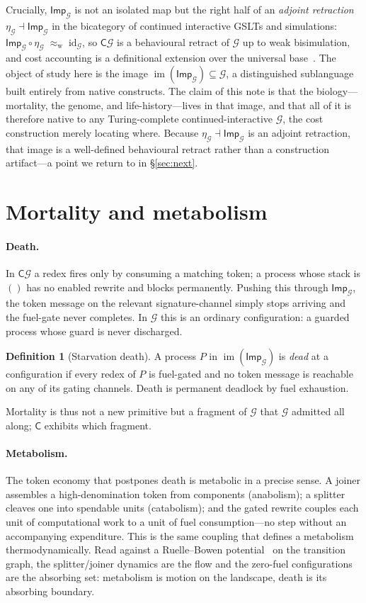 \documentclass[11pt]{article}
\theoremstyle{plain}
\theoremstyle{definition}
\newtheorem{definition}{Definition}
\theoremstyle{remark}
\newcommand{\G}{\mathcal{G}}
\newcommand{\C}{\mathsf{C}}
\newcommand{\Imp}{\mathsf{Imp}}
\newcommand{\unit}{\eta}
\newcommand{\wbisim}{\;\approx_{\mathrm{w}}\;}
\newcommand{\id}{\mathrm{id}}
\begin{document}
Crucially, $\Imp_\G$ is not an isolated map but the right half of an
\emph{adjoint retraction} $\unit_\G\dashv\Imp_\G$ in the bicategory of continued
interactive GSLTs and simulations: $\Imp_\G\circ\unit_\G\wbisim\id_\G$, so $\C\G$
is a behavioural retract of $\G$ up to weak bisimulation, and cost accounting is
a definitional extension over the universal base~\cite{noteII}. The object of
study here is the image $\operatorname{im}(\Imp_\G)\subseteq\G$, a distinguished
sublanguage built entirely from native constructs. The claim of this note is
that the biology---mortality, the genome, and life-history---lives in that
image, and that all of it is therefore native to any Turing-complete
continued-interactive $\G$, the cost construction merely locating where. Because
$\unit_\G\dashv\Imp_\G$ is an adjoint retraction, that image is a well-defined
behavioural retract rather than a construction artifact---a point we return to
in \S\ref{sec:next}.

\section{Mortality and metabolism}
\label{sec:mortality}

\paragraph{Death.}
In $\C\G$ a redex fires only by consuming a matching token; a process whose
stack is $()$ has no enabled rewrite and blocks permanently. Pushing this
through $\Imp_\G$, the token message on the relevant signature-channel simply
stops arriving and the fuel-gate never completes. In $\G$ this is an ordinary
configuration: a guarded process whose guard is never discharged.

\begin{definition}[Starvation death]
A process $P$ in $\operatorname{im}(\Imp_\G)$ is \emph{dead} at a
configuration if every redex of $P$ is fuel-gated and no token message is
reachable on any of its gating channels. Death is permanent deadlock by
fuel exhaustion.
\end{definition}

Mortality is thus not a new primitive but a fragment of $\G$ that $\G$ admitted
all along; $\C$ exhibits which fragment.

\paragraph{Metabolism.}
The token economy that postpones death is metabolic in a precise sense. A
joiner assembles a high-denomination token from components (anabolism); a
splitter cleaves one into spendable units (catabolism); and the gated rewrite
couples each unit of computational work to a unit of fuel consumption---no step
without an accompanying expenditure. This is the same coupling that defines a
metabolism thermodynamically. Read against a Ruelle--Bowen
potential~\cite{ruelle1978,bowen1975} on the
transition graph, the splitter/joiner dynamics are the flow and the zero-fuel
configurations are the absorbing set: metabolism is motion on the landscape,
death is its absorbing boundary.
\end{document}
